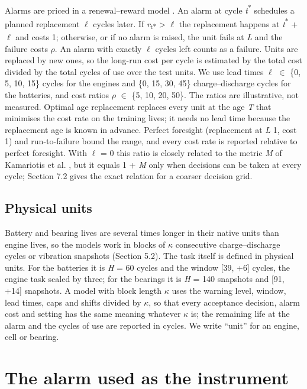 \documentclass[a4paper,fleqn,doubleblind]{cas-dc}
\begin{document}
Alarms are priced in a renewal--reward model \cite{barlow1960}. An alarm at cycle \textit{t}\textsuperscript{*} schedules a planned replacement $\ell$ cycles later. If \textit{r}\textsubscript{t*} > $\ell$ the replacement happens at \textit{t}\textsuperscript{*} + $\ell$ and costs 1; otherwise, or if no alarm is raised, the unit fails at \textit{L} and the failure costs $\rho$. An alarm with exactly $\ell$ cycles left counts as a failure. Units are replaced by new ones, so the long-run cost per cycle is estimated by the total cost divided by the total cycles of use over the test units. We use lead times $\ell$ $\in$ \{0, 5, 10, 15\} cycles for the engines and \{0, 15, 30, 45\} charge--discharge cycles for the batteries, and cost ratios $\rho$ $\in$ \{5, 10, 20, 50\}. The ratios are illustrative, not measured. Optimal age replacement replaces every unit at the age \textit{T} that minimises the cost rate on the training lives; it needs no lead time because the replacement age is known in advance. Perfect foresight (replacement at \textit{L} \textminus{} 1, cost 1) and run-to-failure bound the range, and every cost rate is reported relative to perfect foresight. With $\ell$ = 0 this ratio is closely related to the metric \textit{M} of Kamariotis et al. \cite{kamariotis2024}, but it equals 1 + \textit{M} only when decisions can be taken at every cycle; Section 7.2 gives the exact relation for a coarser decision grid.

\subsection{Physical units}

Battery and bearing lives are several times longer in their native units than engine lives, so the models work in blocks of $\kappa$ consecutive charge--discharge cycles or vibration snapshots (Section 5.2). The task itself is defined in physical units. For the batteries it is \textit{H} = 60 cycles and the window [\textminus{}39, +6] cycles, the engine task scaled by three; for the bearings it is \textit{H} = 140 snapshots and [\textminus{}91, +14] snapshots. A model with block length $\kappa$ uses the warning level, window, lead times, caps and shifts divided by $\kappa$, so that every acceptance decision, alarm cost and setting has the same meaning whatever $\kappa$ is; the remaining life at the alarm and the cycles of use are reported in cycles. We write ``unit'' for an engine, cell or bearing.

\section{The alarm used as the instrument}\label{sec:4}
\end{document}
